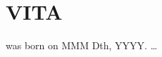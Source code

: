 \section*{\MakeUppercase{Vita}}

\MyName \hspace{0.05in} was born on MMM Dth, YYYY. \dots \lipsum[1-2] 
